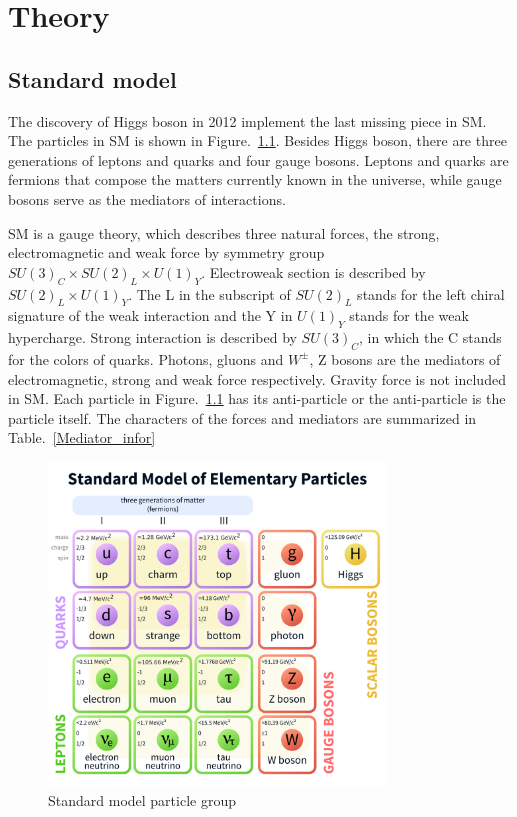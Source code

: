 
\chapter{Theory}

\section{Standard model}
The discovery of Higgs boson in 2012 implement the last missing piece in SM.  The particles in SM is shown in Figure.~\ref{fig:SM_particles}. Besides Higgs boson, there are three generations of leptons and quarks and four gauge bosons. 
Leptons and quarks are fermions that compose the matters currently known in the universe, while gauge bosons serve as the mediators of interactions.  

SM is a gauge theory, which describes three natural forces, the strong, electromagnetic and weak force by symmetry group $SU(3)_{C}\times SU(2)_{L}\times U(1)_{Y}$. Electroweak section is described by $SU(2)_{L}\times U(1)_{Y}$. The L in the subscript of $SU(2)_{L}$ stands for the left chiral signature of the weak interaction and the Y in $U(1)_{Y}$ stands for the weak hypercharge. Strong interaction is described by $SU(3)_{C}$, in which the C stands for the colors of quarks.  Photons, gluons and $W^{\pm}$, Z bosons are the mediators of electromagnetic, strong and weak force respectively.  Gravity force is not included in SM. Each particle in Figure.~\ref{fig:SM_particles} has its anti-particle or the anti-particle is the particle itself. The characters of the forces and mediators are summarized in Table.~\ref{Mediator_infor}

\begin{figure}[htbp] 
\centering
\includegraphics[width=0.8\textwidth]{chapter2/SM_particle_table.pdf}
\caption{Standard model particle group\cite{SM_particletable}}
\label{fig:SM_particles}
\end{figure}


